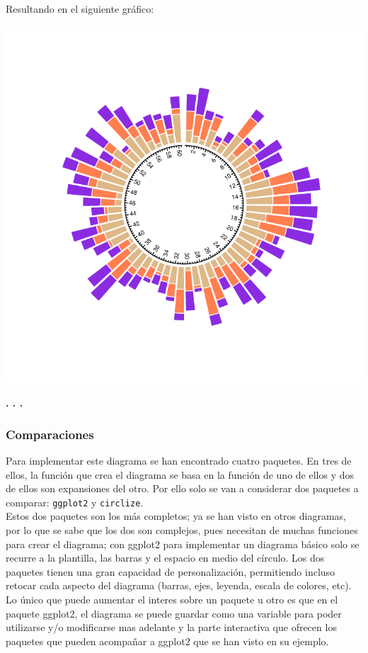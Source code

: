 \documentclass{article}\usepackage[]{graphicx}\usepackage[]{color}
\makeatletter
\def\maxwidth{ %
  \ifdim\Gin@nat@width>\linewidth
    \linewidth
  \else
    \Gin@nat@width
  \fi
}
\newenvironment{knitrout}{}{} %
\makeatother
\begin{document}
\clearpage
Resultando en el siguiente gr\'afico:
\begin{knitrout}
\color{fgcolor}

{\centering \includegraphics[width=\maxwidth]{figure/circlize_col_sep-1} 

}



\end{knitrout}
\begin{center}
\textbf{. . .}
\end{center}
\subsubsection{Comparaciones}
Para implementar este diagrama se han encontrado cuatro paquetes. En tres de ellos, la funci\'on que crea el diagrama se basa en la funci\'on de uno de ellos y dos de ellos son expansiones del otro. Por ello solo se van a considerar dos paquetes a comparar: \texttt{ggplot2} y \texttt{circlize}.~\\
Estos dos paquetes son los m\'as completos; ya se han visto en otros diagramas, por lo que se sabe que los dos son complejos, pues necesitan de muchas funciones para crear el diagrama; con ggplot2 para implementar un diagrama b\'asico solo se recurre a la plantilla, las barras y el espacio en medio del c\'irculo. Los dos paquetes tienen una gran capacidad de personalizaci\'on, permitiendo incluso retocar cada aspecto del diagrama (barras, ejes, leyenda, escala de colores, etc). Lo \'unico que puede aumentar el interes sobre un paquete u otro es que en el paquete ggplot2, el diagrama se puede guardar como una variable para poder utilizarse y/o modificarse mas adelante y la parte interactiva que ofrecen los paquetes que pueden acompa\~nar a ggplot2 que se han visto en su ejemplo.
\clearpage
\end{document}
